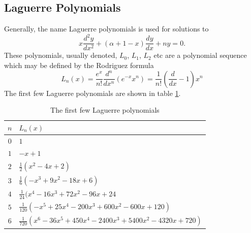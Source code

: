 \documentclass[10pt, a4paper]{amsart}
\begin{document}
\begin{appendix}
\section{Laguerre Polynomials}
\label{app:laguerre}
Generally, the name Laguerre polynomials is used for solutions to 
\begin{equation}
x\frac{d^2y}{dx^2}+(\alpha+1-x)\frac{dy}{dx} + ny = 0.
\end{equation}
These polynomials, usually denoted, $L_0$, $L_1$, $L_2$ etc are a polynomial sequence which may be defined by the Rodriguez formula
\begin{equation}
L_n(x) = \frac{e^x}{n!}\frac{d^n}{dx^n}(e^{-x}x^n)=\frac{1}{n!}\left(\frac{d}{dx} -1 \right)x^n
\end{equation}
The first few Laguerre polynomials are shown in table \ref{tab:laguerre}.

\begin{table}[ht]
	\centering
	\caption{The first few Laguerre polynomials}
	\begin{tabular}{cl} \hline
	$n$ & $L_n(x)$  \\ \hline
	$0$ & $1$ \\
	$1$ & $-x+1$ \\
	$2$ & $\frac{1}{2}(x^2-4x+2)$ \\
	$3$ & $\frac{1}{6}(-x^3+9x^2-18x+6)$ \\
	$4$ & $\frac{1}{24}(x^4-16x^3+72x^2-96x+24$ \\
	$5$ & $\frac{1}{120}(-x^5+25x^4-200x^3+600x^2-600x+120) $ \\
	$6$ & $\frac{1}{720}(x^6-36x^5+450x^4-2400x^3+5400x^2-4320x+720)$ \\ \hline
	\end{tabular}
	\label{tab:laguerre}
\end{table}

\end{appendix}
\end{document}
